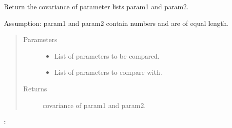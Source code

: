 \documentclass[letterpaper,10pt,english]{sphinxmanual}
\begin{document}
\begin{fulllineitems}
\label{\detokenize{dataProcessing:dataProcessing.covariance}}
\sphinxAtStartPar
Return the covariance of parameter lists param1 and param2.

\sphinxAtStartPar
Assumption: param1 and param2 contain numbers and are of equal length.
\begin{quote}\begin{description}
\item[{Parameters}] \leavevmode\begin{itemize}
\item {} 
\sphinxAtStartPar
{} \textendash{} List of parameters to be compared.

\item {} 
\sphinxAtStartPar
{} \textendash{} List of parameters to compare with.

\end{itemize}

\item[{Returns}] \leavevmode
\sphinxAtStartPar
covariance of param1 and param2.

\end{description}\end{quote}

\begin{sphinxVerbatim}[commandchars=\\\{\}]
\PYG{p}{[}     \PYG{p}{]} \PYG{p}{[}     \PYG{p}{]}
\PYG{p}{[}\PYG{p}{]} \PYG{p}{[} \PYG{p}{]}
: 
\end{sphinxVerbatim}

\end{fulllineitems}
\end{document}
